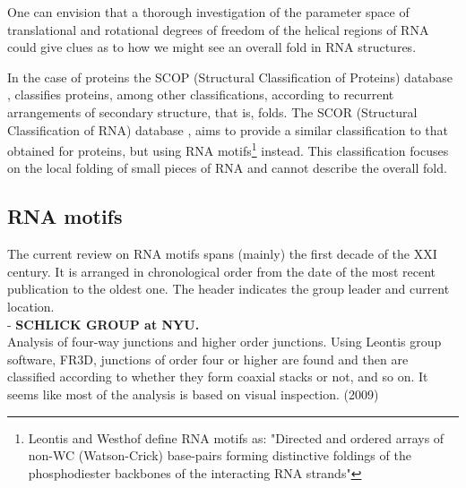 One can envision that a  thorough investigation of the parameter space
of  translational and  rotational degrees  of freedom  of  the helical
regions of RNA could give clues as to how we might see an overall fold
in RNA structures.

In  the  case  of  proteins  the SCOP  (Structural  Classification  of
Proteins)  database  \cite{andreeva2004},  classifies proteins,  among
other   classifications,  according   to  recurrent   arrangements  of
secondary   structure,   that   is,   folds.  The   SCOR   (Structural
Classification of RNA) database \cite{klosterman2002, klosterman2004},
aims  to  provide  a  similar  classification  to  that  obtained  for
proteins,   but   using   RNA  motifs\footnote{Leontis   and   Westhof
  \cite{leontis2003}  define  RNA  motifs  as: "Directed  and  ordered
  arrays  of  non-WC  (Watson-Crick)  base-pairs  forming  distinctive
  foldings  of the  phosphodiester  backbones of  the interacting  RNA
  strands"} instead. This classification  focuses on the local folding
of small pieces of RNA and cannot describe the overall fold.

\subsection{RNA motifs}
The current review on RNA motifs spans (mainly) the first decade of the
XXI century. It is arranged in chronological order from the date of the
most recent publication to the oldest one. The header indicates the group
leader and current location.\\

- \textbf{SCHLICK GROUP at NYU.}\\
Analysis of four-way junctions and higher order junctions.
Using Leontis group software, FR3D, junctions of order four or higher are found
and then are classified according to whether they form coaxial stacks
or not, and so on. It seems like most of the analysis is based on
visual inspection. (2009)
\cite{laing2009} \cite{laing2009a}\\

